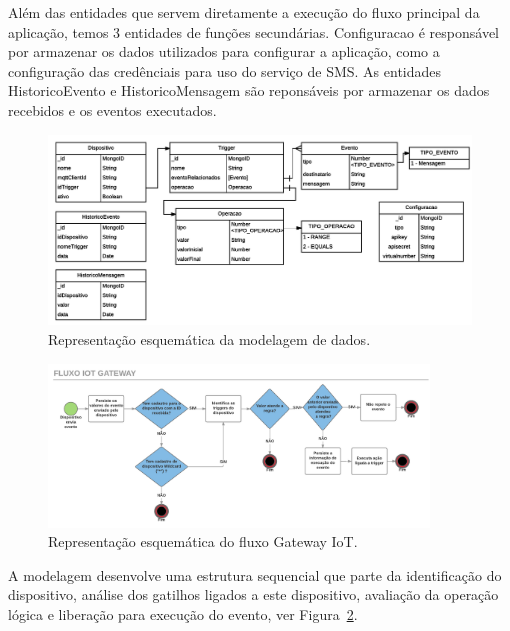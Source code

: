 Além das entidades que servem diretamente a execução do fluxo principal da aplicação, temos 3 entidades de funções secundárias. Configuracao é responsável por armazenar os dados utilizados para configurar a aplicação, como a configuração das credênciais para uso do serviço de SMS. As entidades HistoricoEvento e HistoricoMensagem são reponsáveis por armazenar os dados recebidos e os eventos executados.

\begin{figure}[h!]
	\begin{center}
		\includegraphics[width=1.085\textwidth]{./img/modelo-de-dados}
		\caption{Representação esquemática da modelagem de dados.}
		\label{fig:modeloDeDados}
	\end{center}
\end{figure}

\begin{figure}[h!]
		\begin{center}
		\includegraphics[width=0.9\textwidth]{./img/fluxograma}
		\caption{Representação esquemática do fluxo Gateway IoT.}
		\label{fig:fluxograma}
	\end{center}
\end{figure}

A modelagem desenvolve uma estrutura sequencial que parte da identificação do dispositivo, análise dos gatilhos ligados a este dispositivo, avaliação da operação lógica e liberação para execução do evento, ver Figura~\ref{fig:fluxograma}.  

